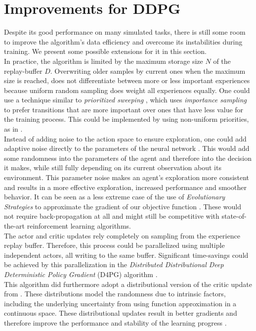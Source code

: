 \section{Improvements for DDPG}
\label{sec:improvements}
Despite its good performance on many simulated tasks, there is still some room to improve the algorithm's data efficiency and overcome its instabilities during training. We present some possible extensions for it in this section.\\
In practice, the algorithm is limited by the maximum storage size $\mathit{N}$ of the replay-buffer $\mathit{D}$. Overwriting older samples by current ones when the maximum size is reached, does not differentiate between more or less important experiences because uniform random sampling does weight all experiences equally. One could use a technique similar to \textit{prioritized sweeping} \citep{moore1993prioritized}, which uses \textit{importance sampling} \citep{glynn1989importance} to prefer transitions that are more important over ones that have less value for the training process. This could be implemented by using non-uniform priorities, as in \citep{schaul2015prioritized,barth2018distributed}.\\
Instead of adding noise to the action space to ensure exploration, one could add adaptive noise directly to the parameters of the neural network \citep{plappert2017parameter}. This would add some randomness into the parameters of the agent and therefore into the decision it makes, while still fully depending on its current observation about its environment. This parameter noise makes an agent's exploration more consistent and results in a more effective exploration, increased performance and smoother behavior. 
It can be seen as a less extreme case of the use of \textit{Evolutionary Strategies} to approximate the gradient of our objective function \citep{salimans2017evolution}. These would not require back-propagation at all and might still be competitive with state-of-the-art reinforcement learning algorithms.\\
The actor and critic updates rely completely on sampling from the experience replay buffer. Therefore, this process could be parallelized using multiple independent actors, all writing to the same buffer. Significant time-savings could be achieved by this parallelization in the \textit{Distributed Distributional Deep Deterministic Policy Gradient} (D4PG) algorithm  \citep{barth2018distributed}.\\
This algorithm did furthermore adopt a distributional version of the critic update from \citep{bellemare2017distributional}. These distributions model the randomness due to intrinsic factors, including the underlying uncertainty from using function approximation in a continuous space. These distributional updates result in better gradients and therefore improve the performance and stability of the learning progress \citep{barth2018distributed}.\\
